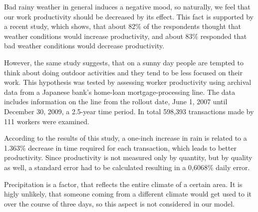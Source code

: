 
Bad rainy weather in general induces a negative mood, so naturally, we feel that our work productivity should be decreased by its effect. This fact is supported by a recent study, which shows, that about 82\% of the respondents thought that weather conditions would increase productivity, and about 83\% responded that bad weather conditions would decrease productivity.

However, the same study suggests, that on a sunny day people are tempted to think about doing outdoor activities and they tend to be less focused on their work. This hypothesis was tested by assessing worker productivity using archival data
from a Japanese bank’s home-loan mortgage-processing line. The data includes information on the line from the rollout date, June 1, 2007 until December 30, 2009, a 2.5-year time period. In total 598,393 transactions made by 111 workers were examined. 

According to the results of this study, a one-inch increase in rain is related to
a 1.363\% decrease in time required for each transaction, which leads to better productivity. Since productivity is not measured only by quantity, but by quality as well, a standard error had to be calculated resulting in a 0,6068\% daily error. 

Precipitation is a factor, that reflects the entire climate of a certain area. It is higly unlikely, that someone coming from a different climate would get used to it over the course of three days, so this aspect is not considered in our model.

